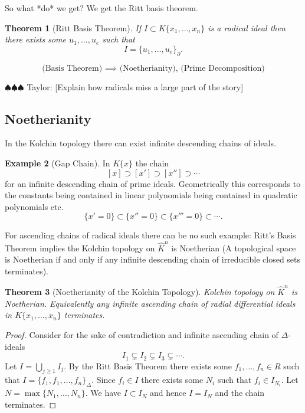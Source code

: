 \documentclass[12pt]{book}
\newcommand{\taylor}[1]{{\color{blue} \sf $\spadesuit\spadesuit\spadesuit$ Taylor: [#1]}}
\numberwithin{equation}{section}
\newtheorem{theorem}{Theorem}[subsection]
\theoremstyle{definition}
\newtheorem{example}[theorem]{Example}
\theoremstyle{remark}
\begin{document}
So what *do* we get?  We get the Ritt basis theorem.
\begin{theorem}[Ritt Basis Theorem]
	If $I \subset K\lbrace x_1,\ldots,x_n \rbrace$ is a radical ideal then there exists some $u_1,\ldots,u_e$ such that 
	 $$ I = \lbrace u_1,\ldots,u_e \rbrace_{\partial}.$$
\end{theorem}

$$ \mbox{ (Basis Theorem) $\implies$ (Noetherianity), (Prime Decomposition) }$$

\taylor{Explain how radicals miss a large part of the story}

\subsection{Noetherianity}
In the Kolchin topology there can exist infinite descending chains of ideals.
\begin{example}[Gap Chain]
In $K\lbrace x \rbrace$ the chain 
$$[x]\supset [x'] \supset [x''] \supset \cdots$$
for an infinite descending chain of prime ideals.
Geometrically this corresponds to the constants being contained in linear polynomials being contained in quadratic polynomials etc. 
 $$ \lbrace x' =0 \rbrace \subset \lbrace x'' =0 \rbrace \subset \lbrace x''' =0 \rbrace \subset \cdots. $$
\end{example}
For ascending chains of radical ideals there can be no such example: Ritt's Basis Theorem implies the Kolchin topology on $\widehat{K}^n$ is Noetherian (A topological space is Noetherian if and only if any infinite descending chain of irreducible closed sets terminates). 

\begin{theorem}[Noetherianity of the Kolchin Topology]
 Kolchin topology on $\widehat{K}^n$ is Noetherian. 
 Equivalently any infinite ascending chain of radial differential ideals in $K\lbrace x_1,\ldots, x_n\rbrace$ terminates.
\end{theorem}
\begin{proof}
	Consider for the sake of contradiction and infinite ascending chain of $\Delta$-ideals
	 $$I_1 \subsetneq I_2 \subsetneq I_3 \subsetneq \cdots. $$
	Let $I = \bigcup_{j \geq 1} I_j$.
	By the Ritt Basis Theorem there exists some $f_1,\ldots,f_n\in R$ such that $I = \lbrace f_1,f_1,\ldots,f_n\rbrace_{\Delta}$.
	Since $f_i \in I$ there exists some $N_i$ such that $f_i \in I_{N_i}$. 
	Let $N= \max\lbrace N_1,\ldots,N_n\rbrace$. 
	We have $I \subset I_N$ and hence $I=I_N$ and the chain terminates.
\end{proof}
\end{document}
